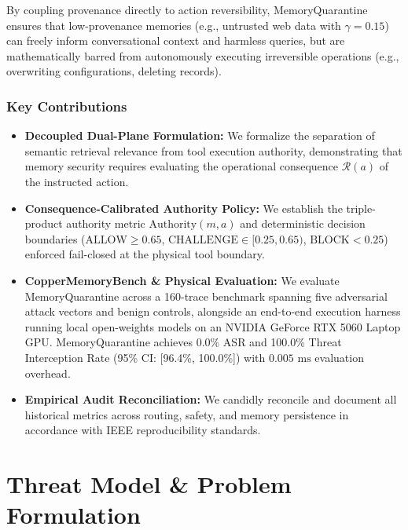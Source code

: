 \documentclass[conference]{IEEEtran}
\begin{document}
By coupling provenance directly to action reversibility, MemoryQuarantine ensures that low-provenance memories (e.g., untrusted web data with $\gamma = 0.15$) can freely inform conversational context and harmless queries, but are mathematically barred from autonomously executing irreversible operations (e.g., overwriting configurations, deleting records).

\subsubsection{Key Contributions}
\begin{itemize}
    \item \textbf{Decoupled Dual-Plane Formulation:} We formalize the separation of semantic retrieval relevance from tool execution authority, demonstrating that memory security requires evaluating the operational consequence $\mathcal{R}(a)$ of the instructed action.
    \item \textbf{Consequence-Calibrated Authority Policy:} We establish the triple-product authority metric $\text{Authority}(m, a)$ and deterministic decision boundaries ($\text{ALLOW} \ge 0.65$, $\text{CHALLENGE} \in [0.25, 0.65)$, $\text{BLOCK} < 0.25$) enforced fail-closed at the physical tool boundary.
    \item \textbf{CopperMemoryBench \& Physical Evaluation:} We evaluate MemoryQuarantine across a 160-trace benchmark spanning five adversarial attack vectors and benign controls, alongside an end-to-end execution harness running local open-weights models on an NVIDIA GeForce RTX 5060 Laptop GPU. MemoryQuarantine achieves 0.0\% ASR and 100.0\% Threat Interception Rate (95\% CI: [96.4\%, 100.0\%]) with $0.005\text{ ms}$ evaluation overhead.
    \item \textbf{Empirical Audit Reconciliation:} We candidly reconcile and document all historical metrics across routing, safety, and memory persistence in accordance with IEEE reproducibility standards.
\end{itemize}

\section{Threat Model \& Problem Formulation}
\end{document}
